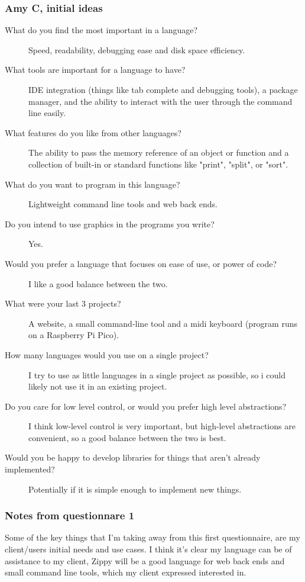\documentclass[a4paper,12pt]{article}
\begin{document}
{\subsubsection{Amy C, initial ideas}
\begin{description}
	\item[What do you find the most important in a language?]
		Speed, readability, debugging ease and disk space efficiency.
	\item[What tools are important for a language to have?] 
		IDE integration (things like tab complete and debugging tools), a 
		package manager, and the ability to interact with the user through the 
		command line easily.
	\item[What features do you like from other languages?] 
		The ability to pass the memory reference of an object or function and a
		collection of built-in or standard functions like "print", "split", 
		or "sort".
	\item[What do you want to program in this language?]
		Lightweight command line tools and web back ends.
	\item[Do you intend to use graphics in the programs you write?]
		Yes.
	\item[Would you prefer a language that focuses on ease of 
		use, or power of code?]
		I like a good balance between the two.
	\item[What were your last 3 projects?]
		A website, a small command-line tool and a midi keyboard (program runs 
		on a Raspberry Pi Pico).
	\item[How many languages would you use on a single project?]
		I try to use as little languages in a single project as possible, so i 
		could likely not use it in an existing project.
	\item[Do you care for low level control, or would you prefer 
		high level abstractions?]
		I think low-level control is very important, but high-level abstractions
		are convenient, so a good balance between the two is best.
	\item[Would you be happy to develop libraries for things that aren't 
		already implemented?]
		Potentially if it is simple enough to implement new things.
\end{description}
\subsubsection{Notes from questionnare 1}
Some of the key things that I'm taking away from this first questionnaire, are my 
client/users initial needs and use cases. I think it's clear my language can be of
assistance to my client, Zippy will be a good language for web back ends and 
small command line tools, which my client expressed interested in.

}
\end{document}
